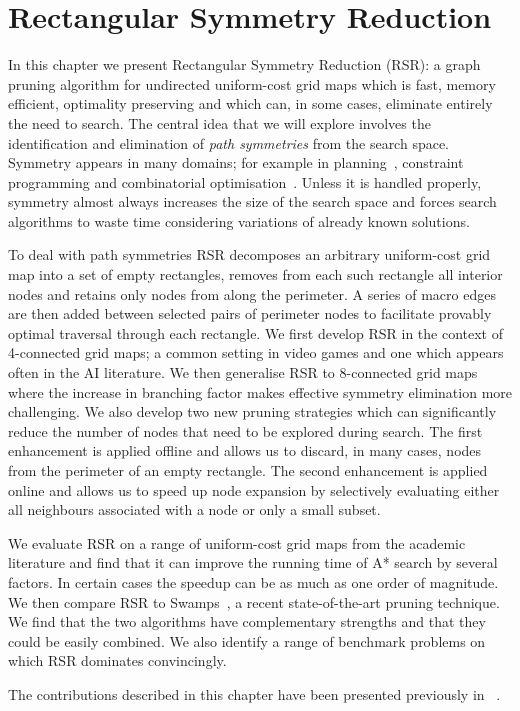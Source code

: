 \chapter{Rectangular Symmetry Reduction}
\label{cha::rsr} 
In this chapter we present Rectangular Symmetry Reduction (RSR): a graph
pruning algorithm for undirected uniform-cost grid maps which is fast, memory
efficient, optimality preserving and which can, in some cases, eliminate
entirely the need to search.  The central idea that we will explore involves
the identification and elimination of \emph{path symmetries} from the search
space.  Symmetry appears in many domains; for example in
planning~\citep{fox99}, constraint programming \citep{walsh07} and
combinatorial optimisation~\citep{fukunaga08}.  Unless it is handled properly,
symmetry almost always increases the size of the search space and forces
search algorithms to waste time considering variations of already known
solutions.
\par
To deal with path symmetries RSR decomposes an arbitrary uniform-cost grid map
into a set of empty rectangles, removes from each such rectangle all interior
nodes and retains only nodes from along the perimeter.  A series of macro edges
are then added between selected pairs of perimeter nodes to facilitate
provably optimal traversal through each rectangle.  We first develop RSR in
the context of 4-connected grid maps; a common setting in video games and one
which appears often in the AI literature.  We then generalise RSR to
8-connected grid maps where the increase in branching factor makes effective
symmetry elimination more challenging.  We also develop two new pruning
strategies which can significantly reduce the number of nodes that need to be
explored during search.  The first enhancement is applied offline and allows
us to discard, in many cases, nodes from the perimeter of an empty rectangle.
The second enhancement is applied online and allows us to speed up node
expansion by selectively evaluating either all neighbours associated with a
node or only a small subset.

We evaluate RSR on a range of uniform-cost grid maps from the academic
literature and find that it can improve the running time of A* search by
several factors. In certain cases the speedup can be as much as one order of
magnitude. We then compare RSR to Swamps~\citep{pochter10}, a recent
state-of-the-art pruning technique. We find that the two algorithms have
complementary strengths and that they could be easily combined. We also
identify a range of benchmark problems on which RSR dominates convincingly.
\par

The contributions described in this chapter have been presented previously in
~\citep{harabor10,harabor11a,harabor11c}.

